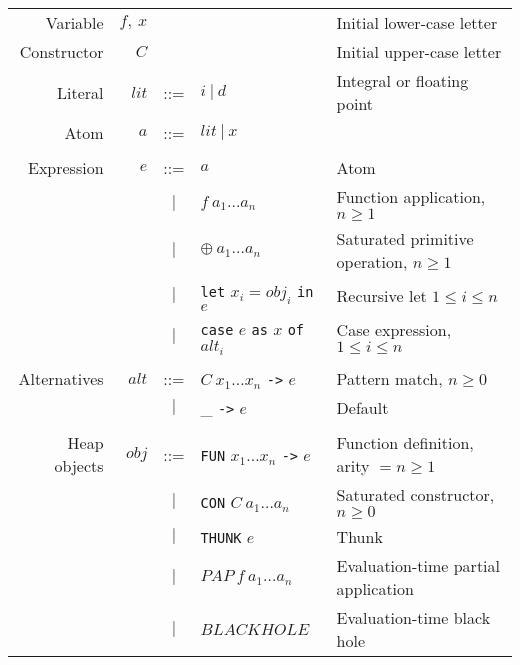 \documentclass{llncs}
\begin{document}
\begin{table}
\footnotesize %
\centering
\begin{tabular}{r r c l l}

Variable     & $f,\ x$        &     &                                              & Initial lower-case letter \\
Constructor  & $C$            &     &                                              & Initial upper-case letter \\
Literal      & $\mathit{lit}$ & ::= & $i\ |\ d$                                    & Integral or floating point \\
Atom         & $a$            & ::= & $\mathit{lit}\ |\ x$                         & \\ %
\\
Expression   & $e$            & ::= & $a$                                          & Atom \\
             &                & $|$ & $f\ a_1\dots a_n$                            & Function application, $n\ge 1$ \\
             &                & $|$ & $\oplus\ a_1\dots a_n$                       & Saturated primitive operation, $n\ge 1$ \\
             &                & $|$ & \texttt{let} $x_i = \mathit{obj}_i$ 
                                         \texttt{in} $e$                           & Recursive let $1\le i \le n$\\
             &                & $|$ & \texttt{case} $e$ \texttt{as} 
                                        $x$ \texttt{of} $\mathit{alt}_i$           & Case expression, $1\le i \le n$\\
\\
Alternatives & $\mathit{alt}$ & ::= & $C\ x_1\dots x_n$ \texttt{->} $e$            & Pattern match, $n \ge 0$ \\
             &                & $|$ & \_                \texttt{->} $e$            & Default \\
\\
Heap objects & $\mathit{obj}$ & ::= &\texttt{FUN} $x_1\dots x_n$ \texttt{->} $e$   & Function definition, arity $=n\ge 1$ \\
             &                & $|$ &\texttt{CON} $C\ a_1\dots a_n$                & Saturated constructor, $n \ge 0$ \\
             &                & $|$ &\texttt{THUNK} $e$                            & Thunk \\
             &                & $|$ & $\mathit{PAP}\ f\ a_1\dots a_n$               & Evaluation-time partial application \\
             &                & $|$ & $\mathit{BLACKHOLE}$                         & Evaluation-time black hole
\end{tabular}
\end{table}
\end{document}

